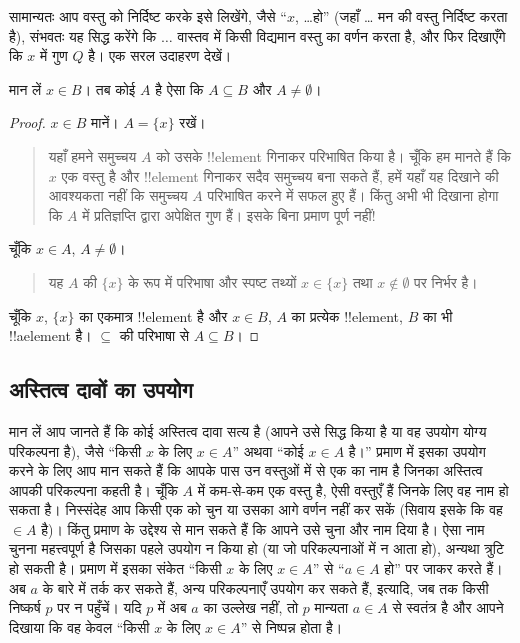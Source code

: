\documentclass[../../../include/open-logic-section]{subfiles}
\begin{document}
सामान्यतः आप वस्तु को निर्दिष्ट करके इसे लिखेंगे, जैसे ``$x$, \dots हो''
(जहाँ \dots{} मन की वस्तु निर्दिष्ट करता है), संभवतः यह सिद्ध करेंगे कि
$\dots$ वास्तव में किसी विद्यमान वस्तु का वर्णन करता है, और फिर दिखाएँगे कि
$x$ में गुण $Q$ है। एक सरल उदाहरण देखें।

\begin{prop}
  मान लें $x\in B$। तब कोई $A$ है ऐसा कि $A\subseteq B$ और
  $A\neq\emptyset$।
\end{prop}

\begin{proof}
  $x\in B$ मानें। $A=\{x\}$ रखें।
  \begin{quote}
    यहाँ हमने समुच्चय $A$ को उसके !!{element} गिनाकर परिभाषित किया है।
    चूँकि हम मानते हैं कि $x$ एक वस्तु है और !!{element} गिनाकर सदैव
    समुच्चय बना सकते हैं, हमें यहाँ यह दिखाने की आवश्यकता नहीं कि समुच्चय
    $A$ परिभाषित करने में सफल हुए हैं। किंतु अभी भी दिखाना होगा कि $A$ में
    प्रतिज्ञप्ति द्वारा अपेक्षित गुण हैं। इसके बिना प्रमाण पूर्ण नहीं!{}
  \end{quote}
  चूँकि $x\in A$, $A\neq\emptyset$।
  \begin{quote}
    यह $A$ की $\{x\}$ के रूप में परिभाषा और स्पष्ट तथ्यों
    $x\in\{x\}$ तथा $x\notin\emptyset$ पर निर्भर है।
  \end{quote}
  चूँकि $x$, $\{x\}$ का एकमात्र !!{element} है और $x\in B$, $A$ का
  प्रत्येक !!{element}, $B$ का भी !!a{element} है। $\subseteq$ की
  परिभाषा से $A\subseteq B$।
\end{proof}

\subsection{अस्तित्व दावों का उपयोग}

मान लें आप जानते हैं कि कोई अस्तित्व दावा सत्य है (आपने उसे सिद्ध किया है
या वह उपयोग योग्य परिकल्पना है), जैसे ``किसी $x$ के लिए $x\in A$'' अथवा
``कोई $x\in A$ है।'' प्रमाण में इसका उपयोग करने के लिए आप मान सकते हैं कि
आपके पास उन वस्तुओं में से एक का नाम है जिनका अस्तित्व आपकी परिकल्पना कहती
है। चूँकि $A$ में कम-से-कम एक वस्तु है, ऐसी वस्तुएँ हैं जिनके लिए वह नाम हो
सकता है। निस्संदेह आप किसी एक को चुन या उसका आगे वर्णन नहीं कर सकें (सिवाय
इसके कि वह $\in A$ है)। किंतु प्रमाण के उद्देश्य से मान सकते हैं कि आपने
उसे चुना और नाम दिया है। ऐसा नाम चुनना महत्त्वपूर्ण है जिसका पहले उपयोग न
किया हो (या जो परिकल्पनाओं में न आता हो), अन्यथा त्रुटि हो सकती है। प्रमाण
में इसका संकेत ``किसी $x$ के लिए $x\in A$'' से ``$a\in A$ हो'' पर जाकर
करते हैं। अब $a$ के बारे में तर्क कर सकते हैं, अन्य परिकल्पनाएँ उपयोग कर
सकते हैं, इत्यादि, जब तक किसी निष्कर्ष $p$ पर न पहुँचें। यदि $p$ में अब $a$
का उल्लेख नहीं, तो $p$ मान्यता $a\in A$ से स्वतंत्र है और आपने दिखाया कि
वह केवल ``किसी $x$ के लिए $x\in A$'' से निष्पन्न होता है।
\end{document}

